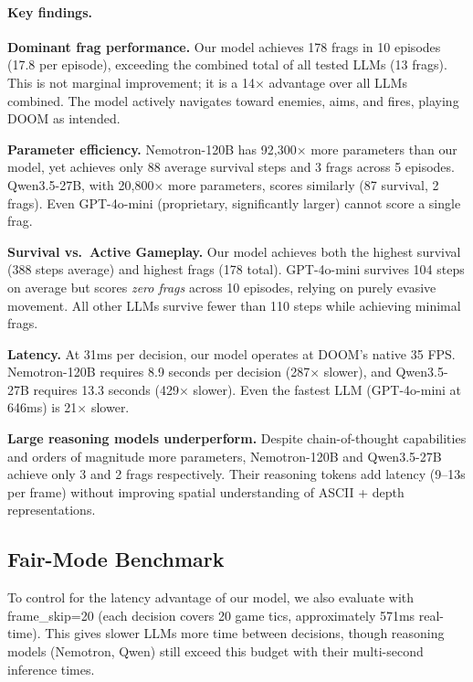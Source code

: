 \documentclass[11pt,a4paper]{article}
\begin{document}
\paragraph{Key findings.}

\textbf{Dominant frag performance.} Our model achieves 178 frags in 10 episodes (17.8 per episode), exceeding the combined total of all tested LLMs (13 frags). This is not marginal improvement; it is a 14$\times$ advantage over all LLMs combined. The model actively navigates toward enemies, aims, and fires, playing DOOM as intended.

\textbf{Parameter efficiency.} Nemotron-120B has 92,300$\times$ more parameters than our model, yet achieves only 88 average survival steps and 3 frags across 5 episodes. Qwen3.5-27B, with 20,800$\times$ more parameters, scores similarly (87 survival, 2 frags). Even GPT-4o-mini (proprietary, significantly larger) cannot score a single frag.

\textbf{Survival vs.\ Active Gameplay.} Our model achieves both the highest survival (388 steps average) and highest frags (178 total). GPT-4o-mini survives 104 steps on average but scores \textit{zero frags} across 10 episodes, relying on purely evasive movement. All other LLMs survive fewer than 110 steps while achieving minimal frags.

\textbf{Latency.} At 31ms per decision, our model operates at DOOM's native 35 FPS. Nemotron-120B requires 8.9 seconds per decision (287$\times$ slower), and Qwen3.5-27B requires 13.3 seconds (429$\times$ slower). Even the fastest LLM (GPT-4o-mini at 646ms) is 21$\times$ slower.

\textbf{Large reasoning models underperform.} Despite chain-of-thought capabilities and orders of magnitude more parameters, Nemotron-120B and Qwen3.5-27B achieve only 3 and 2 frags respectively. Their reasoning tokens add latency (9--13s per frame) without improving spatial understanding of ASCII + depth representations.

\subsection{Fair-Mode Benchmark}

To control for the latency advantage of our model, we also evaluate with frame\_skip=20 (each decision covers 20 game tics, approximately 571ms real-time). This gives slower LLMs more time between decisions, though reasoning models (Nemotron, Qwen) still exceed this budget with their multi-second inference times.
\end{document}
